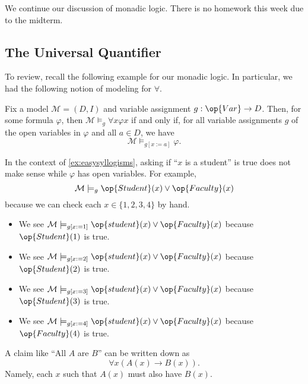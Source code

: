
We continue our discussion of monadic logic. There is no homework this week due to the midterm.

\subsection{The Universal Quantifier}
To review, recall the following example for our monadic logic.
\easymonad*
In particular, we had the following notion of modeling for $\forall$.
\begin{definition}
	Fix a model $\mathcal M=(D,I)$ and variable assignment $g:\op{Var}\to D$. Then, for some formula $\varphi$, then $\mathcal M\models_g\forall x\varphi x$ if and only if, for all variable assignments $g$ of the open variables in $\varphi$ and all $a\in D$, we have
	\[\mathcal M\models_{g[x:=a]}\varphi.\]
\end{definition}
\begin{example}
	In the context of \autoref{ex:easysyllogisms}, asking if ``$x$ is a student'' is true does not make sense while $\varphi$ has open variables. For example,
	\[\mathcal M\models_g\op{Student}(x)\lor\op{Faculty}(x)\]
	because we can check each $x\in\{1,2,3,4\}$ by hand.
	\begin{itemize}
		\item We see $\mathcal M\models_{g[x:=1]}\op{student}(x)\lor\op{Faculty}(x)$ because $\op{Student}(1)$ is true.
		\item We see $\mathcal M\models_{g[x:=2]}\op{student}(x)\lor\op{Faculty}(x)$ because $\op{Student}(2)$ is true.
		\item We see $\mathcal M\models_{g[x:=3]}\op{student}(x)\lor\op{Faculty}(x)$ because $\op{Student}(3)$ is true.
		\item We see $\mathcal M\models_{g[x:=4]}\op{student}(x)\lor\op{Faculty}(x)$ because $\op{Faculty}(4)$ is true.
	\end{itemize}
\end{example}
\begin{remark}
	A claim like ``All $A$ are $B$'' can be written down as
	\[\forall x(A(x)\to B(x)).\]
	Namely, each $x$ such that $A(x)$ must also have $B(x)$.
\end{remark}

